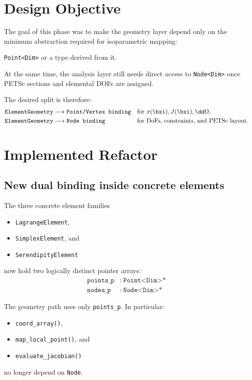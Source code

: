\section{Design Objective}

The goal of this phase was to make the geometry layer depend only on the
minimum abstraction required for isoparametric mapping:

\begin{center}
\texttt{Point<Dim>} or a type derived from it.
\end{center}

At the same time, the analysis layer still needs direct access to
\texttt{Node<Dim>} once PETSc sections and elemental DOFs are assigned.

The desired split is therefore:
\begin{align*}
  \texttt{ElementGeometry}
  &\longrightarrow
  \texttt{Point/Vertex binding} && \text{for } x(\bxi), J(\bxi), \dd\Omega, \\
  \texttt{ElementGeometry}
  &\longrightarrow
  \texttt{Node binding} && \text{for DoFs, constraints, and PETSc layout.}
\end{align*}

\section{Implemented Refactor}

\subsection{New dual binding inside concrete elements}

The three concrete element families
\begin{itemize}[nosep]
  \item \texttt{LagrangeElement},
  \item \texttt{SimplexElement}, and
  \item \texttt{SerendipityElement}
\end{itemize}
now hold two logically distinct pointer arrays:
\begin{align*}
  \texttt{points\_p} &:\ \texttt{Point<Dim>*} \\
  \texttt{nodes\_p}  &:\ \texttt{Node<Dim>*}
\end{align*}

The geometry path uses only \texttt{points\_p}.  In particular:
\begin{itemize}[nosep]
  \item \texttt{coord\_array()},
  \item \texttt{map\_local\_point()}, and
  \item \texttt{evaluate\_jacobian()}
\end{itemize}
no longer depend on \texttt{Node}.

